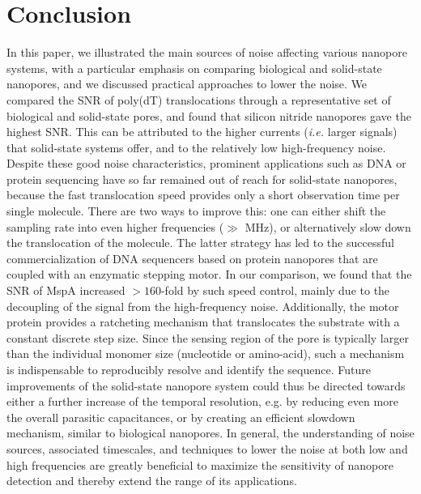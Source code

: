 \section{Conclusion}


In this paper, we illustrated the main sources of noise affecting various nanopore systems, with a particular emphasis on comparing biological and solid-state nanopores, and we discussed practical approaches to lower the noise. We compared the SNR of poly(dT) translocations through a representative set of biological and solid-state pores, and found that silicon nitride nanopores gave the highest SNR. This can be attributed to the higher currents (\emph{i.e.} larger signals) that solid-state systems offer, and to the relatively low high-frequency noise. Despite these good noise characteristics, prominent applications such as DNA or protein sequencing have so far remained out of reach for solid-state nanopores, because the fast translocation speed provides only a short observation time per single molecule. There are two ways to improve this: one can either shift the sampling rate into even higher frequencies ($\gg$ MHz), or alternatively slow down the translocation of the molecule. The latter strategy has led to the successful commercialization of DNA sequencers based on protein nanopores that are coupled with an enzymatic stepping motor. In our comparison, we found that the SNR of MspA increased $>160$-fold by such speed control, mainly due to the decoupling of the signal from the high-frequency noise. Additionally, the motor protein provides a ratcheting mechanism that translocates the substrate with a constant discrete step size. Since the sensing region of the pore is typically larger than the individual monomer size (nucleotide or amino-acid), such a mechanism is indispensable to reproducibly resolve and identify the sequence. Future improvements of the solid-state nanopore system could thus be directed towards either a further increase of the temporal resolution, e.g. by reducing even more the overall parasitic capacitances, or by creating an efficient slowdown mechanism, similar to biological nanopores. In general, the understanding of noise sources, associated timescales, and techniques to lower the noise at both low and high frequencies are greatly beneficial to maximize the sensitivity of nanopore detection and thereby extend the range of its applications.






